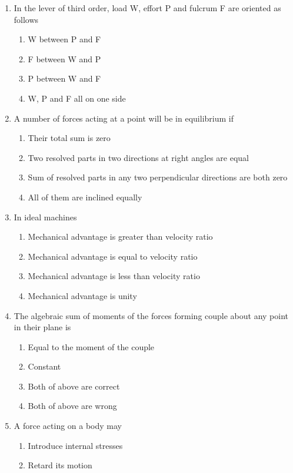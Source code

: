 \documentclass[11pt,a4paper]{article}
\begin{document}
\begin{enumerate}
\begin{enumerate*}[itemjoin=\qquad, label=\Alph*.]
\end{enumerate*}
\item{In the lever of third order, load W, effort P and fulcrum F are oriented as follows}
\begin{enumerate}[label=\Alph*.]
\item{W between P and F}
\item{F between W and P}
\item{P between W and F}
\item{W, P and F all on one side}
\end{enumerate}
\item{A number of forces acting at a point will be in equilibrium if}
\begin{enumerate}[label=\Alph*.]
\item{Their total sum is zero}
\item{Two resolved parts in two directions at right angles are equal}
\item{Sum of resolved parts in any two perpendicular directions are both zero}
\item{All of them are inclined equally}
\end{enumerate}
\item{In ideal machines}
\begin{enumerate}[label=\Alph*.]
\item{Mechanical advantage is greater than velocity ratio}
\item{Mechanical advantage is equal to velocity ratio}
\item{Mechanical advantage is less than velocity ratio}
\item{Mechanical advantage is unity}
\end{enumerate}
\item{The algebraic sum of moments of the forces forming couple about any point in their plane is}
\begin{enumerate}[label=\Alph*.]
\item{Equal to the moment of the couple}
\item{Constant}
\item{Both of above are correct}
\item{Both of above are wrong}
\end{enumerate}
\item{A force acting on a body may}
\begin{enumerate}[label=\Alph*.]
\item{Introduce internal stresses}
\item{Retard its motion}

\end{enumerate}
\end{enumerate}
\end{document}
